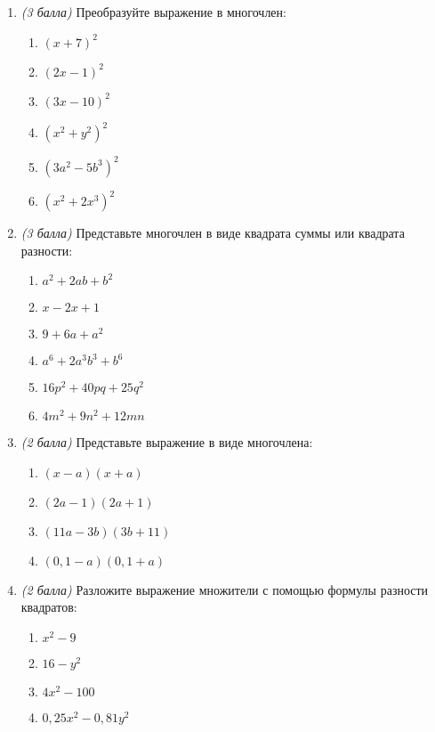 \documentclass[12pt, a4paper]{article}
\begin{document}
	
	
	\begin{enumerate}
		\item \textit{(3 балла)} Преобразуйте выражение в многочлен:
		\begin{multicols}{2}
			\begin{enumerate}[label=\asbuk*)]
				\item $(x+7)^2$
				\item $(2x-1)^2$
				\item $(3x-10)^2$
				\item $(x^2+y^2)^2$
				\item $(3a^2-5b^3)^2$
				\item $(x^2+2x^3)^2$
			\end{enumerate}
		\end{multicols}
		\item \textit{(3 балла)} Представьте многочлен в виде квадрата суммы или квадрата разности:
		\begin{multicols}{2}
			\begin{enumerate}[label=\asbuk*)]
				\item $a^2+2ab+b^2$
				\item $x-2x+1$
				\item $9+6a+a^2$
				\item $a^6+2a^3b^3+b^6$
				\item $16p^2+40pq+25q^2$
				\item $4m^2+9n^2+12mn$
			\end{enumerate}
		\end{multicols}
		\item \textit{(2 балла)} Представьте выражение в виде многочлена:
		\begin{multicols}{2}
			\begin{enumerate}[label=\asbuk*)]
				\item $(x-a)(x+a)$
				\item $(2a-1)(2a+1)$
				\item $(11a-3b)(3b+11)$
				\item $(0,1-a)(0,1+a)$
			\end{enumerate}
		\end{multicols}
		\item \textit{(2 балла)} Разложите выражение множители с помощью формулы разности квадратов:
		\begin{multicols}{2}
			\begin{enumerate}[label=\asbuk*)]
				\item $x^2-9$
				\item $16-y^2$
				\item $4x^2-100$
				\item $0,25x^2-0,81y^2$
			\end{enumerate}
		\end{multicols}
	\end{enumerate}
\end{document}
